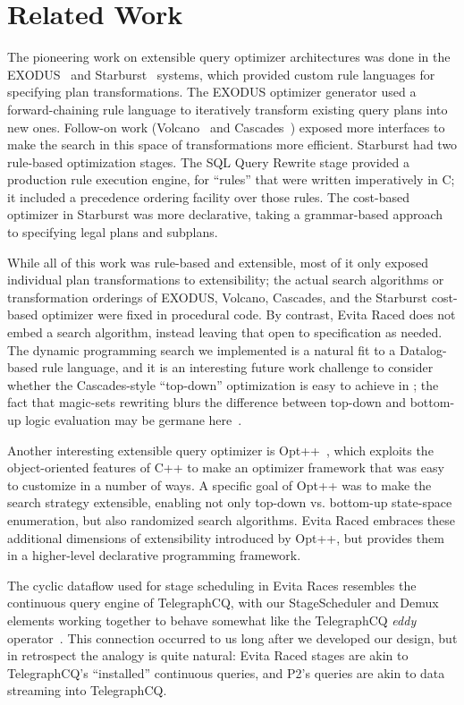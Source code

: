 \section{Related Work}
\label{ch:evita:sec:related}

The pioneering work on extensible query optimizer architectures was done in the EXODUS~\cite{exodus} and Starburst~\cite{lohman,phh92} systems, which provided custom rule languages for specifying plan transformations.  The EXODUS optimizer generator used a forward-chaining rule language to iteratively transform existing query plans into new ones. Follow-on work (Volcano~\cite{volcano} and Cascades~\cite{cascades}) exposed more interfaces to make the search in this space of transformations more efficient.  Starburst had two rule-based optimization stages.  The SQL Query Rewrite stage provided a production rule execution engine, for ``rules'' that were written imperatively in C; it included a precedence ordering facility over those rules.  The cost-based optimizer in Starburst was more declarative, taking a grammar-based approach to specifying legal plans and subplans.

While all of this work was rule-based and extensible, most of it only exposed individual plan transformations to extensibility; the actual search algorithms or transformation orderings of EXODUS, Volcano, Cascades, and the Starburst cost-based optimizer were fixed in procedural code.  By contrast, Evita Raced does not embed a search algorithm, instead leaving that open to specification as needed.  The dynamic programming search we implemented is a natural fit to a Datalog-based rule language, and it is an interesting future work challenge to consider whether the Cascades-style ``top-down'' optimization is easy to achieve in \OVERLOG; the fact that magic-sets rewriting blurs the difference between top-down and bottom-up logic evaluation may be germane here~\cite{topdownbottomup}.

Another interesting extensible query optimizer is Opt++~\cite{kabradewitt}, which exploits the object-oriented features of C++ to make an optimizer framework that was easy to customize in a number of ways.  A specific goal of Opt++ was to make the search strategy extensible, enabling not only top-down vs. bottom-up state-space enumeration, but also randomized search algorithms.  Evita Raced embraces these additional dimensions of extensibility introduced by Opt++, but provides them in a higher-level declarative programming framework.

The cyclic dataflow used for stage scheduling in Evita Races resembles the continuous query engine of TelegraphCQ, with our StageScheduler and Demux elements working together to behave somewhat like the TelegraphCQ {\em eddy} operator~\cite{tcq-cidr}.  This connection occurred to us long after we developed our design, but in retrospect the analogy is quite natural: Evita Raced stages are akin to TelegraphCQ's ``installed'' continuous queries, and P2's \OVERLOG queries are akin to data streaming into TelegraphCQ.

